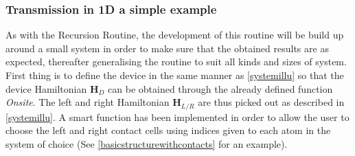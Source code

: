 \subsubsection{Transmission in 1D a simple example}
As with the Recursion Routine, the development of this routine will be build up around a small system in order to make sure that the obtained results are as expected, thereafter generalising the routine to suit all kinds and sizes of system. First thing is to define the device in the same manner as \cref{systemillu} so that the device Hamiltonian \(\textbf{H}_D\) can be obtained through the already defined function \textit{Onsite}. The left and right Hamiltonian \(\textbf{H}_{L/R}\) are thus picked out as described in \cref{systemillu}. A smart function has been implemented in order to allow the user to choose the left and right contact cells using indices given to each atom in the system of choice (See \cref{basicstructurewithcontacts} for an example).
